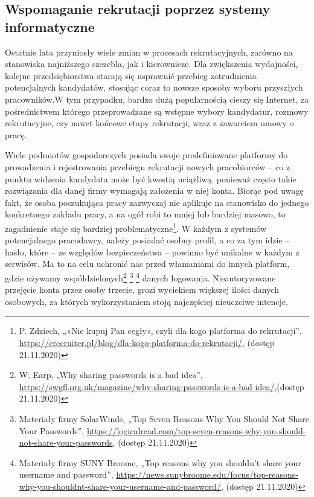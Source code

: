 \documentclass[twoside]{projektInzynierskiMS}
\numberwithin{figure}{section}
\begin{document}
\subsection{Wspomaganie rekrutacji poprzez systemy informatyczne}
Ostatnie lata przyniosły wiele zmian w procesach rekrutacyjnych, zarówno na stanowiska najniższego szczebla, jak i kierownicze. Dla zwiększenia wydajności, kolejne przedsiębiorstwa starają się usprawnić przebieg zatrudnienia potencjalnych kandydatów, stosując coraz to nowsze sposoby wyboru przyszłych pracowników.\linebreak W tym przypadku, bardzo dużą popularnością cieszy się Internet, za pośrednictwem którego przeprowadzane są wstępne wybory kandydatur, rozmowy rekrutacyjne, czy nawet końcowe etapy rekrutacji, wraz z zawarciem umowy o pracę.

Wiele podmiotów gospodarczych posiada swoje predefiniowane platformy do prowadzenia i rejestrowania przebiegu rekrutacji nowych pracobiorców – co z punktu widzenia kandydata może być kwestią uciążliwą, ponieważ często takie rozwiązania dla danej firmy wymagają założenia w niej konta. Biorąc pod uwagę fakt, że osoba poszukująca pracy zazwyczaj nie aplikuje na stanowisko do jednego konkretnego zakładu pracy, a na ogół robi to mniej lub bardziej masowo, to zagadnienie staje się bardziej problematyczne\footnote{P. Zdziech, „«Nie kupuj Pan cegły», czyli dla kogo platforma do rekrutacji”, \newline \url{https://erecruiter.pl/blog/dla-kogo-platforma-do-rekrutacji/}, (dostęp 21.11.2020)}.
W każdym z systemów potencjalnego pracodawcy, należy posiadać osobny profil, a co za tym idzie -- hasło, które – ze względów bezpieczeństwa – powinno być unikalne w każdym z serwisów. Ma to na celu uchronić nas przed włamaniami do innych platform, gdzie używamy współdzielonych\footnote{W. Earp, „Why sharing passwords is a bad idea”, \newline 
\url{https://swgfl.org.uk/magazine/why-sharing-passwords-is-a-bad-idea/},\newline (dostęp 21.11.2020)}
\footnote{Materiały firmy SolarWinds, „Top Seven Reasons Why You Should Not Share Your Passwords”, \newline 
\url{https://logicalread.com/top-seven-reasons-why-you-should-not-share-your-passwords}, (dostęp 21.11.2020)}
\footnote{Materiały firmy SUNY Broome, „Top reasons why you shouldn’t share your username and password”, \newline \url{https://news.sunybroome.edu/focus/top-reasons-why-you-shouldnt-share-your-username-and-password/}, (dostęp 21.11.2020)} danych logowania. Nieautoryzowane przejęcie konta przez osoby trzecie, grozi wyciekiem większej ilości danych osobowych, za których wykorzystaniem stoją najczęściej nieuczciwe intencje.
\end{document}
